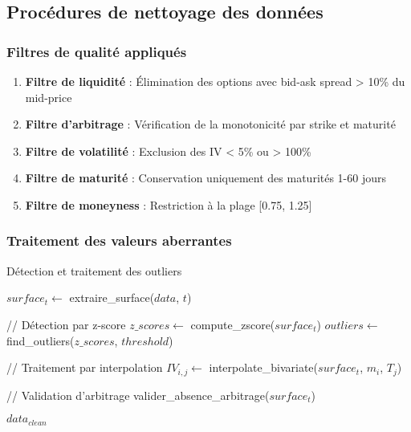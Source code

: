 \subsection{Procédures de nettoyage des données}

\subsubsection{Filtres de qualité appliqués}

\begin{enumerate}
\item \textbf{Filtre de liquidité} : Élimination des options avec bid-ask spread > 10\% du mid-price
\item \textbf{Filtre d'arbitrage} : Vérification de la monotonicité par strike et maturité
\item \textbf{Filtre de volatilité} : Exclusion des IV < 5\% ou > 100\%
\item \textbf{Filtre de maturité} : Conservation uniquement des maturités 1-60 jours
\item \textbf{Filtre de moneyness} : Restriction à la plage [0.75, 1.25]
\end{enumerate}

\subsubsection{Traitement des valeurs aberrantes}

\begin{algorithm}[H]
\caption{Détection et traitement des outliers}
\begin{algorithmic}
        \STATE $surface_t \leftarrow$ extraire\_surface($data$, $t$)
        
        \STATE // Détection par z-score
        \STATE $z\_scores \leftarrow$ compute\_zscore($surface_t$)
        \STATE $outliers \leftarrow$ find\_outliers($z\_scores$, $threshold$)
        
        \STATE // Traitement par interpolation
            \STATE $IV_{i,j} \leftarrow$ interpolate\_bivariate($surface_t$, $m_i$, $T_j$)
        \ENDFOR
        
        \STATE // Validation d'arbitrage
        \STATE valider\_absence\_arbitrage($surface_t$)
    \ENDFOR
    
    \RETURN $data_{clean}$
\ENDFUNCTION
\end{algorithmic}
\end{algorithm}

